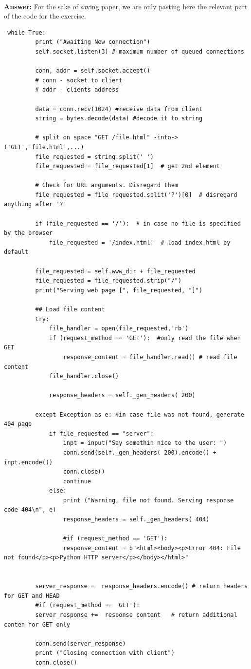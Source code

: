 \documentclass{WeSTassignment}
\begin{document}
\textbf{\\Answer:}
For the sake of saving paper, we are only pasting here the relevant part of the code for the exercise.\\
\begin{lstlisting}
 while True:
         print ("Awaiting New connection")
         self.socket.listen(3) # maximum number of queued connections
         
         conn, addr = self.socket.accept()
         # conn - socket to client
         # addr - clients address
         
         data = conn.recv(1024) #receive data from client
         string = bytes.decode(data) #decode it to string

         # split on space "GET /file.html" -into-> ('GET','file.html',...)
         file_requested = string.split(' ')
         file_requested = file_requested[1]  # get 2nd element

         # Check for URL arguments. Disregard them
         file_requested = file_requested.split('?')[0]  # disregard anything after '?'

         if (file_requested == '/'):  # in case no file is specified by the browser
             file_requested = '/index.html'  # load index.html by default

         file_requested = self.www_dir + file_requested
         file_requested = file_requested.strip("/")
         print("Serving web page [", file_requested, "]")

         ## Load file content
         try:
             file_handler = open(file_requested,'rb')
             if (request_method == 'GET'):  #only read the file when GET
                 response_content = file_handler.read() # read file content
             file_handler.close()

             response_headers = self._gen_headers( 200)

         except Exception as e: #in case file was not found, generate 404 page
             if file_requested == "server":
                 inpt = input("Say somethin nice to the user: ")
                 conn.send(self._gen_headers( 200).encode() + inpt.encode())
                 conn.close()
                 continue
             else:
                 print ("Warning, file not found. Serving response code 404\n", e)
                 response_headers = self._gen_headers( 404)

                 #if (request_method == 'GET'):
                 response_content = b"<html><body><p>Error 404: File not found</p><p>Python HTTP server</p></body></html>"


         server_response =  response_headers.encode() # return headers for GET and HEAD
         #if (request_method == 'GET'):
         server_response +=  response_content   # return additional conten for GET only

         conn.send(server_response)
         print ("Closing connection with client")
         conn.close()
\end{lstlisting}
\end{document}
